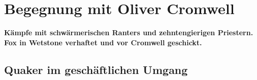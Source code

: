 


\chapter[Begegnung mit Oliver Cromwell]{Begegnung mit Oliver Cromwell}

\begin{center}
\textbf{Kämpfe mit schwärmerischen Ranters und 
zehntengierigen Priestern.
Fox in Wetstone verhaftet und vor Cromwell geschickt.}
\end{center}

\section{Quaker im geschäftlichen Umgang}

